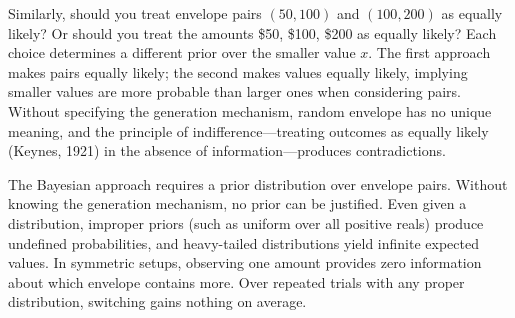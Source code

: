 Similarly, should you treat envelope pairs $(50, 100)$ and $(100, 200)$ as equally likely? Or should you treat the amounts \$50, \$100, \$200 as equally likely? Each choice determines a different prior over the smaller value $x$. The first approach makes pairs equally likely; the second makes values equally likely, implying smaller values are more probable than larger ones when considering pairs. Without specifying the generation mechanism, \QSOpen{}random envelope\QSClose{} has no unique meaning, and the \QSOpen{}principle of indifference\QSClose{}—treating outcomes as equally likely (Keynes, 1921) in the absence of information—produces contradictions.

The Bayesian approach requires a prior distribution over envelope pairs. Without knowing the generation mechanism, no prior can be justified. Even given a distribution, improper priors (such as uniform over all positive reals) produce undefined probabilities, and heavy-tailed distributions yield infinite expected values. In symmetric setups, observing one amount provides zero information about which envelope contains more. Over repeated trials with any proper distribution, switching gains nothing on average.

